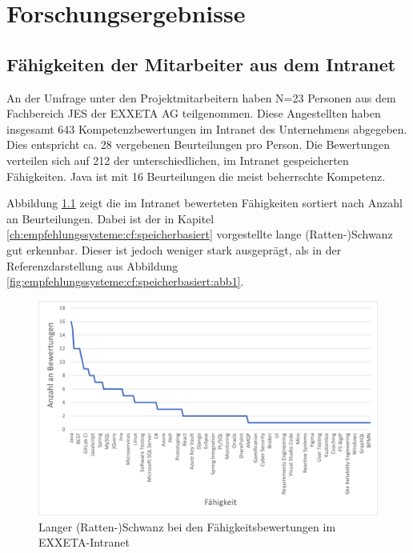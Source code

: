 \chapter{Forschungsergebnisse}
\label{ch:ergebnisse}

\section{Fähigkeiten der Mitarbeiter aus dem Intranet}
\label{ch:ergebnisse:analyse}
An der Umfrage unter den Projektmitarbeitern haben N=23 Personen aus dem Fachbereich \acl{JES} der EXXETA AG teilgenommen. Diese Angestellten haben insgesamt 643 Kompetenzbewertungen im Intranet des Unternehmens abgegeben. Dies entspricht ca. 28 vergebenen Beurteilungen pro Person. Die Bewertungen verteilen sich auf 212 der \anzFaehigkeiten unterschiedlichen, im Intranet gespeicherten Fähigkeiten. Java ist mit 16 Beurteilungen die meist beherrschte Kompetenz.

Abbildung \ref{fig:ergebnisse:analyse:abb1} zeigt die im Intranet bewerteten Fähigkeiten sortiert nach Anzahl an Beurteilungen. Dabei ist der in Kapitel \ref{ch:empfehlungssysteme:cf:speicherbasiert} vorgestellte lange (Ratten-)Schwanz gut erkennbar. Dieser ist jedoch weniger stark ausgeprägt, als in der Referenzdarstellung aus Abbildung \ref{fig:empfehlungssysteme:cf:speicherbasiert:abb1}.

\begin{figure}[h]
	\centering
	\includegraphics[width=1\textwidth]{gfx/long-tail-intranet.png}
	\caption{Langer (Ratten-)Schwanz bei den Fähigkeitsbewertungen im EXXETA-Intranet}
	\label{fig:ergebnisse:analyse:abb1}
\end{figure}

